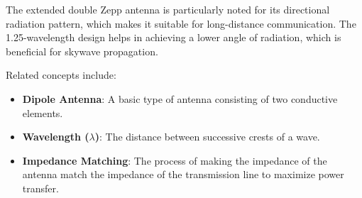 The extended double Zepp antenna is particularly noted for its directional radiation pattern, which makes it suitable for long-distance communication. The 1.25-wavelength design helps in achieving a lower angle of radiation, which is beneficial for skywave propagation.

Related concepts include:
\begin{itemize}
    \item \textbf{Dipole Antenna}: A basic type of antenna consisting of two conductive elements.
    \item \textbf{Wavelength (\(\lambda\))}: The distance between successive crests of a wave.
    \item \textbf{Impedance Matching}: The process of making the impedance of the antenna match the impedance of the transmission line to maximize power transfer.
\end{itemize}

